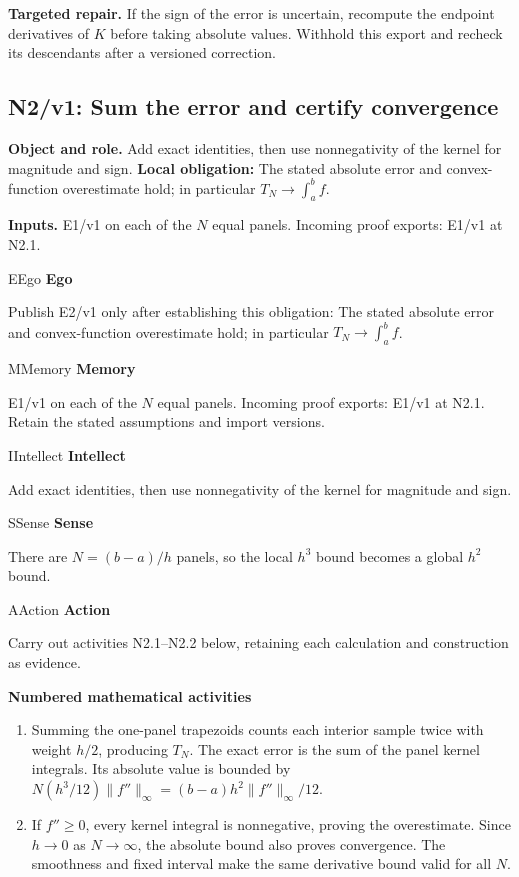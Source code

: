\documentclass[preprint,12pt,aps,pra,showkeys,amsmath,amssymb,superscriptaddress,floatfix]{revtex4-2}
\theoremstyle{definition}
\theoremstyle{remark}
\newcommand{\mmfaculty}[3]{%
 \begin{mmfacultybox}{#1}{#2}
 {\sffamily\bfseries\color{MMBlue}#2}\par\smallskip #3
 \end{mmfacultybox}}
\newcommand{\field}[2]{\par\smallskip\noindent\textbf{#1.} #2\par}
\begin{document}
\field{Targeted repair}{If the sign of the error is uncertain, recompute the endpoint
derivatives of \(K\) before taking absolute values. Withhold this export
and recheck its descendants after a versioned correction.}

\clearpage

\subsection{N2/v1: Sum the error and certify convergence}

\field{Object and role}{Add exact identities, then use nonnegativity of the kernel for magnitude
and sign. \textbf{Local obligation:} The stated absolute error and
convex-function overestimate hold; in particular \(T_N\to\int_a^b f\).}

\field{Inputs}{E1/v1 on each of the \(N\) equal panels. Incoming proof exports: E1/v1
at N2.1.}

\mmfaculty{E}{Ego}{Publish E2/v1 only after establishing this obligation: The stated
absolute error and convex-function overestimate hold; in particular
\(T_N\to\int_a^b f\).}

\mmfaculty{M}{Memory}{E1/v1 on each of the \(N\) equal panels. Incoming proof exports: E1/v1
at N2.1. Retain the stated assumptions and import versions.}

\mmfaculty{I}{Intellect}{Add exact identities, then use nonnegativity of the kernel for magnitude
and sign.}

\mmfaculty{S}{Sense}{There are \(N=(b-a)/h\) panels, so the local \(h^3\) bound becomes a
global \(h^2\) bound.}

\mmfaculty{A}{Action}{Carry out activities N2.1--N2.2 below, retaining each calculation and
construction as evidence.}

\smallskip\noindent\textbf{Numbered mathematical activities}

\begin{enumerate}[label=N2.\arabic*,leftmargin=3.4em]

\item Summing the one-panel trapezoids counts each interior sample twice with
weight \(h/2\), producing \(T_N\). The exact error is the sum of the
panel kernel integrals. Its absolute value is bounded by
\(N(h^3/12)\|f''\|_\infty=(b-a)h^2\|f''\|_\infty/12\).

\item If \(f''\ge0\), every kernel integral is nonnegative, proving the
overestimate. Since \(h\to0\) as \(N\to\infty\), the absolute bound also
proves convergence. The smoothness and fixed interval make the same
derivative bound valid for all \(N\).

\end{enumerate}
\end{document}
